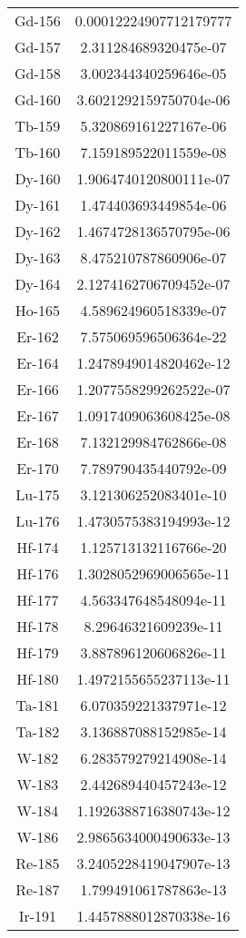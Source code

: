 \begin{table}[h!]
\begin{tabular}{|| c || c |}
Gd-156 & 0.00012224907712179777 \\
Gd-157 & 2.311284689320475e-07 \\
Gd-158 & 3.002344340259646e-05 \\
Gd-160 & 3.6021292159750704e-06 \\
Tb-159 & 5.320869161227167e-06 \\
Tb-160 & 7.159189522011559e-08 \\
Dy-160 & 1.9064740120800111e-07 \\
Dy-161 & 1.474403693449854e-06 \\
Dy-162 & 1.4674728136570795e-06 \\
Dy-163 & 8.475210787860906e-07 \\
Dy-164 & 2.1274162706709452e-07 \\
Ho-165 & 4.589624960518339e-07 \\
Er-162 & 7.575069596506364e-22 \\
Er-164 & 1.2478949014820462e-12 \\
Er-166 & 1.2077558299262522e-07 \\
Er-167 & 1.0917409063608425e-08 \\
Er-168 & 7.132129984762866e-08 \\
Er-170 & 7.789790435440792e-09 \\
Lu-175 & 3.121306252083401e-10 \\
Lu-176 & 1.4730575383194993e-12 \\
Hf-174 & 1.125713132116766e-20 \\
Hf-176 & 1.3028052969006565e-11 \\
Hf-177 & 4.563347648548094e-11 \\
Hf-178 & 8.29646321609239e-11 \\
Hf-179 & 3.887896120606826e-11 \\
Hf-180 & 1.4972155655237113e-11 \\
Ta-181 & 6.070359221337971e-12 \\
Ta-182 & 3.136887088152985e-14 \\
W-182 & 6.283579279214908e-14 \\
W-183 & 2.442689440457243e-12 \\
W-184 & 1.1926388716380743e-12 \\
W-186 & 2.9865634000490633e-13 \\
Re-185 & 3.2405228419047907e-13 \\
Re-187 & 1.799491061787863e-13 \\
Ir-191 & 1.4457888012870338e-16 \\

\end{tabular}
\end{table}
